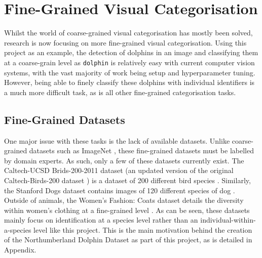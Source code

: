 \section{Fine-Grained Visual Categorisation}\label{ch:Background,sec:Fine-grainedCV}

Whilst the world of coarse-grained visual categorisation has mostly been solved, research is now focusing on more fine-grained visual categorisation. Using this project as an example, the detection of dolphins in an image and classifying them at a coarse-grain level as \texttt{dolphin} is relatively easy with current computer vision systems, with the vast majority of work being setup and hyperparameter tuning. However, being able to finely classify these dolphins with individual identifiers is a much more difficult task, as is all other fine-grained categorisation tasks. 

\subsection{Fine-Grained Datasets}\label{ch:Background,sec:Fine-grainedCV,sub:FGDatasets}

One major issue with these tasks is the lack of available datasets. Unlike coarse-grained datasets such as ImageNet \cite{deng_imagenet:_2009}, these fine-grained datasets must be labelled by domain experts. As such, only a few of these datasets currently exist. The Caltech-UCSD Brids-200-2011 dataset (an updated version of the original Caltech-Birds-200 dataset \cite{welinder_caltech-ucsd_2010}) is a dataset of 200 different bird species \cite{wah_caltech-ucsd_2011}. Similarly, the Stanford Dogs dataset contains images of 120 different species of dog \cite{khosla_novel_2011}. Outside of animals, the Women's Fashion: Coats dataset details the diversity within women's clothing at a fine-grained level \cite{di_style_2013}. As can be seen, these datasets mainly focus on identification at a species level rather than an individual-within-a-species level like this project. This is the main motivation behind the creation of the Northumberland Dolphin Dataset as part of this project, as is detailed in Appendix.

